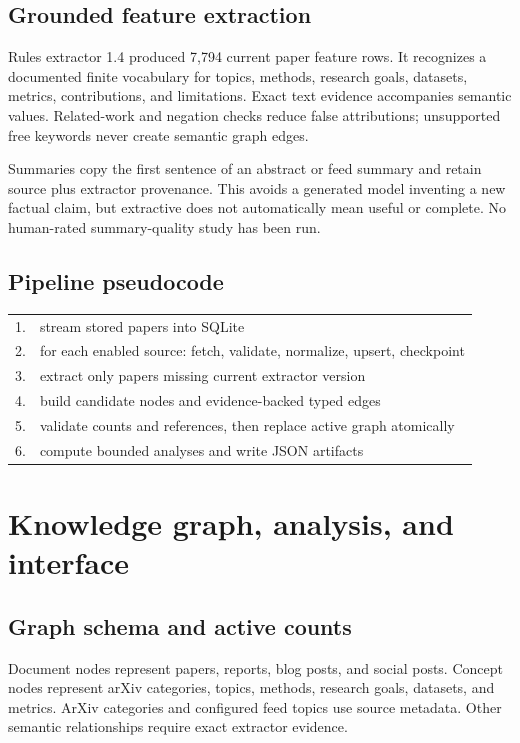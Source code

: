 \documentclass[10pt]{article}
\begin{document}
\subsection{Grounded feature extraction}

Rules extractor 1.4 produced 7,794 current paper feature rows. It recognizes a
documented finite vocabulary for topics, methods, research goals, datasets,
metrics, contributions, and limitations. Exact text evidence accompanies
semantic values. Related-work and negation checks reduce false attributions;
unsupported free keywords never create semantic graph edges.

Summaries copy the first sentence of an abstract or feed summary and retain
source plus extractor provenance. This avoids a generated model inventing a
new factual claim, but extractive does not automatically mean useful or
complete. No human-rated summary-quality study has been run.

\subsection{Pipeline pseudocode}

\begingroup
\small\ttfamily
\begin{tabularx}{\linewidth}{@{}lY@{}}
1. & stream stored papers into SQLite \\
2. & for each enabled source: fetch, validate, normalize, upsert, checkpoint \\
3. & extract only papers missing current extractor version \\
4. & build candidate nodes and evidence-backed typed edges \\
5. & validate counts and references, then replace active graph atomically \\
6. & compute bounded analyses and write JSON artifacts \\
\end{tabularx}
\endgroup

\clearpage

\section{Knowledge graph, analysis, and interface}

\subsection{Graph schema and active counts}

Document nodes represent papers, reports, blog posts, and social posts.
Concept nodes represent arXiv categories, topics, methods, research goals,
datasets, and metrics. ArXiv categories and configured feed topics use source
metadata. Other semantic relationships require exact extractor evidence.
\end{document}
